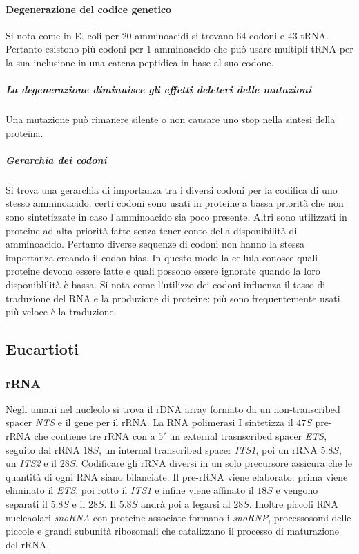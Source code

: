\paragraph{Degenerazione del codice genetico}
Si nota come in E. coli per $20$ amminoacidi si trovano $64$ codoni e $43$ tRNA. Pertanto esistono pi\`u codoni per $1$ amminoacido che pu\`o usare multipli tRNA per la sua inclusione
in una catena peptidica in base al suo codone. 
\subparagraph{La degenerazione diminuisce gli effetti deleteri delle mutazioni}
Una mutazione pu\`o rimanere silente o non causare uno stop nella sintesi della proteina.	
\subparagraph{Gerarchia dei codoni}
Si trova una gerarchia di importanza tra i diversi codoni per la codifica di uno stesso amminoacido: certi codoni sono usati in proteine a bassa priorit\`a che non sono sintetizzate in
caso l'amminoacido sia poco presente. Altri sono utilizzati in proteine ad alta priorit\`a fatte senza tener conto della disponibilit\`a di amminoacido. Pertanto diverse sequenze di 
codoni non hanno la stessa importanza creando il codon bias. In questo modo la cellula conosce quali proteine devono essere fatte e quali possono essere ignorate quando la loro 
disponiblilit\`a \`e bassa. Si nota come l'utilizzo dei codoni influenza il tasso di traduzione del RNA e la produzione di proteine: pi\`u sono frequentemente usati pi\`u veloce 
\`e la traduzione. 
\subsection{Eucartioti}
\subsubsection{rRNA}
Negli umani nel nucleolo si trova il rDNA array formato da un non-transcribed spacer \emph{NTS} e il gene per il rRNA. La RNA polimerasi I sintetizza il $47S$ pre-rRNA che contiene
tre rRNA con a $5'$ un external trasnscribed spacer \emph{ETS}, seguito dal rRNA $18S$, un internal transcribed spacer \emph{ITS1}, poi un rRNA $5.8S$, un \emph{ITS2} e il $28S$. 
Codificare gli rRNA diversi in un solo precursore assicura che le quantit\`a di ogni RNA siano bilanciate. Il pre-rRNA viene elaborato: prima viene eliminato il \emph{ETS}, poi 
rotto il \emph{ITS1} e infine viene affinato il $18S$ e vengono separati il $5.8S$ e il $28S$. Il $5.8S$ andr\`a poi a legarsi al $28S$. Inoltre piccoli RNA nucleaolari \emph{snoRNA}
con proteine associate formano i \emph{snoRNP}, processosomi delle piccole e grandi subunit\`a ribosomali che catalizzano il processo di maturazione del rRNA. 
